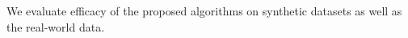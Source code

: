 We evaluate efficacy of the proposed algorithms on synthetic datasets as well as the real-world data.